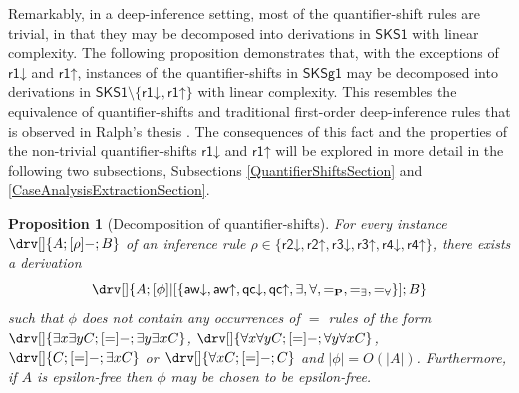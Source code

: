 \documentclass[10pt]{article}
\newtheorem{proposition}[theorem]{Proposition}
\theoremstyle{definition}\newtheorem{remark}[theorem]{Remark}
\theoremstyle{definition}\newtheorem{example}[theorem]{Example}
\theoremstyle{definition}\newtheorem{definition}[theorem]{Definition}
\newcommand{\SKSq}{{\mathsf{SKSg1}}}
\newcommand{\SKSqDecomp}{{\mathsf{SKS1}}}
\newcommand{\awUp}{{\mathsf{aw\mathord\uparrow}}}
\newcommand{\awDown}{{\mathsf{aw\mathord\downarrow}}}
\newcommand{\qcUp}{{\mathsf{qc\mathord\uparrow}}}
\newcommand{\qcDown}{{\mathsf{qc\mathord\downarrow}}}
\newcommand{\rOneUp}{{\mathsf{r1\mathord\uparrow}}}
\newcommand{\rOneDown}{{\mathsf{r1\mathord\downarrow}}}
\newcommand{\rTwoUp}{{\mathsf{r2\mathord\uparrow}}}
\newcommand{\rTwoDown}{{\mathsf{r2\mathord\downarrow}}}
\newcommand{\rThreeUp}{{\mathsf{r3\mathord\uparrow}}}
\newcommand{\rThreeDown}{{\mathsf{r3\mathord\downarrow}}}
\newcommand{\rFourUp}{{\mathsf{r4\mathord\uparrow}}}
\newcommand{\rFourDown}{{\mathsf{r4\mathord\downarrow}}}
\newcommand{\eqProp}{=_{\textbf{P}}}
\newcommand{\eqExists}{=_{\exists}}
\newcommand{\eqForall}{=_{\forall}}
\begin{document}
	Remarkably, in a deep-inference setting, most of the quantifier-shift rules are trivial, in that they may be decomposed into derivations in $\SKSqDecomp$ with linear complexity. The following proposition demonstrates that, with the exceptions of $\rOneDown$ and $\rOneUp$, instances of the quantifier-shifts in $\SKSq$ may be decomposed into derivations in $\SKSqDecomp \setminus \{\rOneDown, \rOneUp\}$ with linear complexity. This resembles the equivalence of quantifier-shifts and traditional first-order deep-inference rules that is observed in Ralph's thesis \cite{BenThesis}. The consequences of this fact and the properties of the non-trivial quantifier-shifts $\rOneDown$ and $\rOneUp$ will be explored in more detail in the following two subsections, Subsections \ref{QuantifierShiftsSection} and \ref{CaseAnalysisExtractionSection}.
	
	\begin{proposition}[Decomposition of quantifier-shifts]\label{RemoveROP}
		For every instance $\drv[] {A ; [\rho]- ; B}$ of an inference rule $\rho \in \{\rTwoDown, \rTwoUp, \rThreeDown, \rThreeUp, \rFourDown, \rFourUp\}$, there exists a derivation
		\[
		\drv[] {
			A ; [\phi]|[\{\awDown, \awUp, \qcDown, \qcUp, \exists, \forall, \eqProp, \eqExists, \eqForall\}] ; B
		}
		\]
		such that $\phi$ does not contain any occurrences of $=$ rules of the form $\drv[] {\exists x \exists y C ; [=]- ; \exists y \exists x C}$, $\drv[] {\forall x \forall y C ; [=]- ; \forall y \forall x C}$, $\drv[] {C ; [=]- ; \exists x C}$ or $\drv[] {\forall x C ; [=]- ; C}$ and $| \phi | = O(| A |)$. Furthermore, if $A$ is epsilon-free then $\phi$ may be chosen to be epsilon-free.
	\end{proposition}
	
\end{document}
